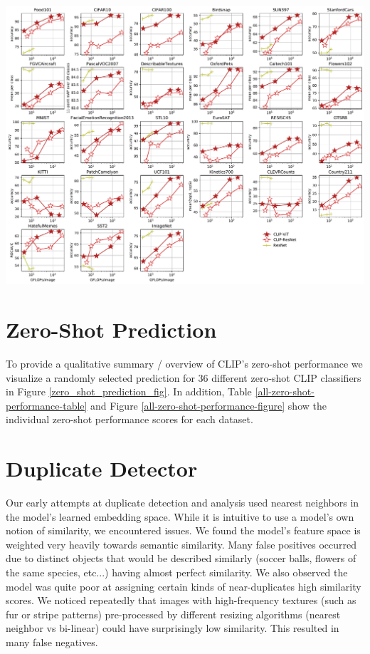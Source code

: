 \documentclass{article}
\begin{document}
\begin{table}[]

\label{all-zero-shot-performance-table}
\vspace{2em}
\includegraphics[width=\textwidth]{zero-shot-transfer.pdf}
\label{all-zero-shot-performance-figure}
\end{table}

\clearpage


\section{Zero-Shot Prediction}

To provide a qualitative summary / overview of CLIP's zero-shot performance we visualize a randomly selected prediction for 36 different zero-shot CLIP classifiers in Figure \ref{zero_shot_prediction_fig}. 
In addition, Table \ref{all-zero-shot-performance-table} and Figure \ref{all-zero-shot-performance-figure} show the individual zero-shot performance scores for each dataset.

\section{Duplicate Detector}
\label{dupdet}

Our early attempts at duplicate detection and analysis used nearest neighbors in the model's learned embedding space. While it is intuitive to use a model's own notion of similarity, we encountered issues. We found the model's feature space is weighted very heavily towards semantic similarity. Many false positives occurred due to distinct objects that would be described similarly (soccer balls, flowers of the same species, etc...) having almost perfect similarity. We also observed the model was quite poor at assigning certain kinds of near-duplicates high similarity scores. We noticed repeatedly that images with high-frequency textures (such as fur or stripe patterns) pre-processed by different resizing algorithms (nearest neighbor vs bi-linear) could have surprisingly low similarity. This resulted in many false negatives. 
\end{document}
